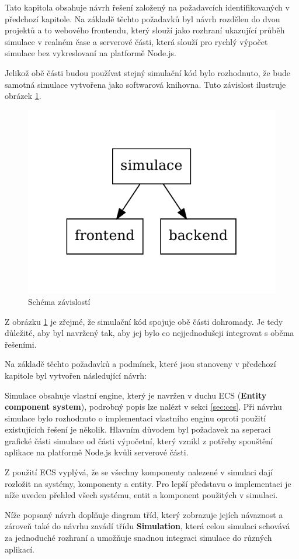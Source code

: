 Tato kapitola obsahuje návrh řešení založený na požadavcích identifikovaných v předchozí kapitole. Na základě těchto požadavků byl návrh rozdělen do dvou projektů a to webového frontendu, který slouží jako rozhraní ukazující průběh simulace v realném čase a serverové části, která slouží pro rychlý výpočet simulace bez vykreslovaní na platformě Node.js.

Jelikož obě části budou používat stejný simulační kód bylo rozhodnuto, že bude samotná simulace vytvořena jako softwarová knihovna. Tuto závislost ilustruje obrázek \ref{fig:dependency}.
\begin{figure}[h!]
	\centering
	\includegraphics[width=0.4\linewidth]{architektura}
	\caption{Schéma závislostí}
	\label{fig:dependency}
\end{figure}


Z obrázku \ref{fig:dependency} je zřejmé, že simulační kód spojuje obě části dohromady. Je tedy důležité, aby byl navržený tak, aby jej bylo co nejjednodušeji integrovat s oběma řešeními.

Na základě těchto požadavků a podmínek, které jsou stanoveny v předchozí kapitole byl vytvořen následující návrh:

\label{sec:ECS}
Simulace obsahuje vlastní engine, který je navržen v duchu ECS (\textbf{Entity component system}), podrobný popis lze nalézt v sekci \ref{sec:ces}. 
Při návrhu simulace bylo rozhodnuto o implementaci vlastního enginu oproti použití existujících řešení je několik. Hlavním důvodem byl požadavek na seperaci grafické části simulace od části výpočetní, který vznikl z potřeby spouštění aplikace na platformě Node.js kvůli serverové části.

Z použití ECS vyplývá, že se všechny komponenty nalezené v simulaci dají rozložit na systémy, komponenty a entity. Pro lepší představu o implementaci je níže uveden přehled všech systému, entit a komponent použitých v simulaci.

Níže popsaný návrh doplňuje diagram tříd, který zobrazuje jejích návaznost a zároveň také do návrhu zavádí třídu \textbf{Simulation}, která celou simulaci schovává za jednoduché rozhraní a umožňuje snadnou integraci simulace do různých aplikací.

